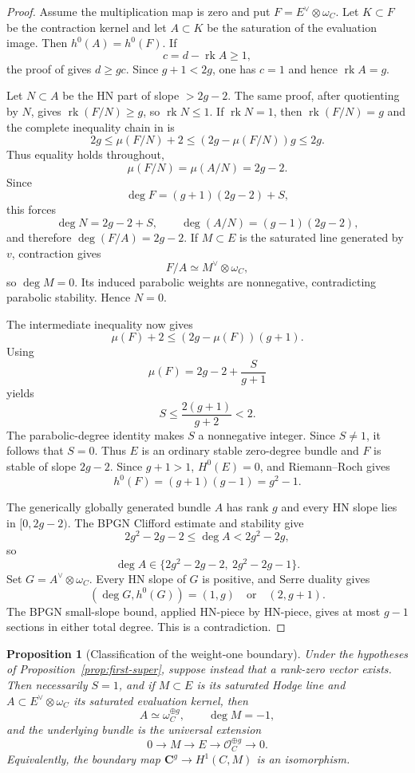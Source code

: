 \documentclass[11pt]{article}
\newtheorem{proposition}[theorem]{Proposition}
\theoremstyle{definition}
\newcommand{\C}{\mathbf C}
\newcommand{\Ocal}{\mathcal O}
\newcommand{\rk}{\operatorname{rk}}
\begin{document}
\begin{proof}
Assume the multiplication map is zero and put
$F=E^\vee\otimes\omega_C$.  Let $K\subset F$ be the contraction kernel and
let $A\subset K$ be the saturation of the evaluation image.  Then
$h^0(A)=h^0(F)$.  If
\[
 c=d-\rk A\ge1,
\]
the proof of \cite[Proposition 6.3.6]{LLGeo} gives $d\ge gc$.  Since
$g+1<2g$, one has $c=1$ and hence $\rk A=g$.

Let $N\subset A$ be the HN part of slope $>2g-2$.  The same proof, after
quotienting by $N$, gives $\rk(F/N)\ge g$, so $\rk N\le1$.  If $\rk N=1$,
then $\rk(F/N)=g$ and the complete inequality chain in
\cite[Lemma 6.2.3]{LLGeo} is
\[
 2g\le\mu(F/N)+2
 \le(2g-\mu(F/N))g
 \le2g.
\]
Thus equality holds throughout,
\[
 \mu(F/N)=\mu(A/N)=2g-2.
\]
Since
\[
 \deg F=(g+1)(2g-2)+S,
\]
this forces
\[
 \deg N=2g-2+S,
 \qquad
 \deg(A/N)=(g-1)(2g-2),
\]
and therefore $\deg(F/A)=2g-2$.  If $M\subset E$ is the saturated line
generated by $v$, contraction gives
\[
 F/A\simeq M^\vee\otimes\omega_C,
\]
so $\deg M=0$.  Its induced parabolic weights are nonnegative, contradicting
parabolic stability.  Hence $N=0$.

The intermediate inequality now gives
\[
 \mu(F)+2\le(2g-\mu(F))(g+1).
\]
Using
\[
 \mu(F)=2g-2+\frac{S}{g+1}
\]
yields
\[
 S\le\frac{2(g+1)}{g+2}<2.
\]
The parabolic-degree identity makes $S$ a nonnegative integer.  Since
$S\ne1$, it follows that $S=0$.  Thus $E$ is an ordinary stable
zero-degree bundle and $F$ is stable of slope $2g-2$.  Since $g+1>1$,
$H^0(E)=0$, and Riemann--Roch gives
\[
 h^0(F)=(g+1)(g-1)=g^2-1.
\]

The generically globally generated bundle $A$ has rank $g$ and every HN
slope lies in $[0,2g-2)$.  The BPGN Clifford estimate and stability give
\[
 2g^2-2g-2\le\deg A<2g^2-2g,
\]
so
\[
 \deg A\in\{2g^2-2g-2,\ 2g^2-2g-1\}.
\]
Set $G=A^\vee\otimes\omega_C$.  Every HN slope of $G$ is positive, and
Serre duality gives
\[
 (\deg G,h^0(G))=(1,g)\quad\text{or}\quad(2,g+1).
\]
The BPGN small-slope bound, applied HN-piece by HN-piece, gives at most
$g-1$ sections in either total degree.  This is a contradiction.
\end{proof}



\begin{proposition}[Classification of the weight-one boundary]
\label{prop:super-classification}
Under the hypotheses of Proposition~\ref{prop:first-super}, suppose instead
that a rank-zero vector exists.  Then necessarily $S=1$, and if $M\subset E$
is its saturated Hodge line and $A\subset E^\vee\otimes\omega_C$ its
saturated evaluation kernel, then
\[
 A\simeq\omega_C^{\oplus g},\qquad \deg M=-1,
\]
and the underlying bundle is the universal extension
\[
 0\longrightarrow M\longrightarrow E
 \longrightarrow\Ocal_C^{\oplus g}\longrightarrow0.
\]
Equivalently, the boundary map $\C^g\to H^1(C,M)$ is an isomorphism.
\end{proposition}
\end{document}
